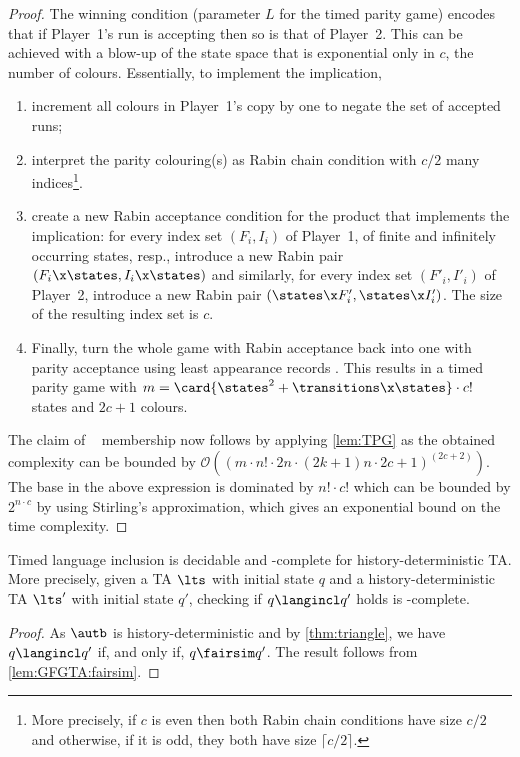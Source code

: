 \begin{proof}
The winning condition (parameter $L$ for the timed parity game) encodes
that if Player~1's run is accepting then so is that of Player~2.
This can be achieved with a blow-up of the state space that is exponential only in $c$, the number of colours.
Essentially, to implement the implication, 
\begin{enumerate}
    \item increment all colours in Player~1's copy by one to negate the set of accepted runs;
    \item interpret the parity colouring(s) as Rabin chain condition with $c/2$ many indices\footnote{More precisely, if $c$ is even then both Rabin chain conditions have size $c/2$ and otherwise, if it is odd, they both have size $\lceil c/2\rceil$.}.
    \item create a new Rabin acceptance condition for the product that implements the implication:
        for every index set $(F_i,I_i)$ of Player~1, of finite and infinitely occurring states, resp.,
        introduce a new Rabin pair $(F_i\x\states, I_i\x\states)$ and similarly,
        for every index set $(F'_i,I'_i)$ of Player~2, introduce a new Rabin pair $(\states\x F'_i, \states\x I'_i)$. The size of the resulting index set is $c$. 
    \item Finally, turn the whole game with Rabin acceptance back into one with parity acceptance
        using least appearance records \cite{Gurevi82,Dziemb97}.
        This results in a timed parity game with $m=\card{\states^2+\transitions\x\states} \cdot c!$
        states and $2c+1$ colours.
\end{enumerate}
The claim of \exptime~ membership now follows by applying \cref{lem:TPG} as the obtained complexity can be bounded by $\mathcal{O}((m\cdot n!\cdot 2n \cdot (2k+1)n \cdot 2c+1)^{(2c+2)})$. The base in the above expression is dominated by $n!\cdot c!$ which can be bounded by $2^{n\cdot c}$ by using Stirling's approximation, which gives an exponential bound on the time complexity. 
\end{proof}
\begin{corollary}\label{cor:inclusion}
    Timed language inclusion is decidable and \EXPTIME-complete
    for history-deterministic TA.
    More precisely, given 
    a TA $\lts$ with initial state $q$
    and a history-deterministic TA $\lts'$ with initial state $q'$,
    checking if $q\langincl q'$ holds is \EXPTIME-complete.
\end{corollary}
\begin{proof}
    As $\autb$ is history-deterministic and by
    \cref{thm:triangle},
    we have 
    $q\langincl q'$ if, and only if,
    $q\fairsim q'$.
    The result follows from 
    \cref{lem:GFGTA:fairsim}.
\end{proof}



